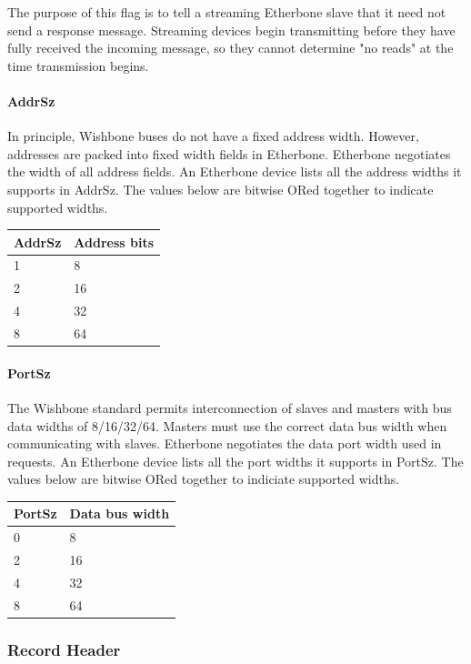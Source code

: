 \documentclass{article}
\begin{document}
The purpose of this flag is to tell 
a streaming Etherbone slave
that it need not send a response message.
Streaming devices begin transmitting 
before they have fully received the incoming message, 
so they cannot determine "no reads" at the time transmission begins.

\paragraph{AddrSz} \label{field:AddrSz}

In principle, 
Wishbone buses do not have a fixed address width.
However, addresses are packed into fixed width fields in Etherbone.
Etherbone negotiates the width of all address fields.
An Etherbone device lists all the address widths it supports in AddrSz.
The values below are bitwise ORed together to indicate supported widths.

\vspace{1em}
\begin{tabular}{|l|l|}
\hline
AddrSz & Address bits \\
\hline
1 & 8 \\
2 & 16 \\
4 & 32 \\
8 & 64 \\
\hline
\end{tabular}

\paragraph{PortSz} \label{field:PortSz}
The Wishbone standard permits interconnection of slaves and masters 
with bus data widths of 8/16/32/64.
Masters must use the correct data bus width when communicating with slaves.
Etherbone negotiates the data port width used in requests.
An Etherbone device lists all the port widths it supports in PortSz.
The values below are bitwise ORed together to indiciate supported widths.

\vspace{1em}
\begin{tabular}{|l|l|}
\hline
PortSz & Data bus width \\
\hline
0 & 8 \\
2 & 16 \\
4 & 32 \\
8 & 64 \\
\hline
\end{tabular}

\subsubsection{Record Header}
\end{document}
